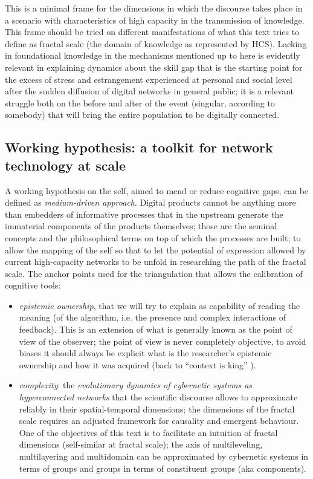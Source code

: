 \documentclass[14pt,a4paper]{extarticle}
\begin{document}
\hspace*{15mm}This is a minimal frame for the dimensions in which the discourse takes place in a scenario with characteristics of high capacity in the transmission of knowledge. This frame should be tried on different manifestations of what this text tries to define as fractal scale (the domain of knowledge as represented by HCS).
\newline
\hspace*{15mm}Lacking in foundational knowledge in the mechanisms mentioned up to here is evidently relevant in explaining dynamics about the skill gap that is the starting point for the excess of stress and estrangement experienced at personal and social level after the sudden diffusion of digital networks in general public; it is a relevant struggle both on the before and after of the event (singular, according to somebody) that will bring the entire population to be digitally connected.

\subsection*{Working hypothesis: a toolkit for network technology at scale}
\label{subsec:toolkit}

\hspace*{15mm}A working hypothesis on the self, aimed to mend or reduce cognitive gaps, can be defined as \textit{medium-driven approach}. Digital products cannot be anything more than embedders of informative processes that in the upstream generate the immaterial components of the products themselves; those are the seminal concepts and the philosophical terms on top of which the processes are built; to allow the mapping of the self so that to let the potential of expression allowed by current high-capacity networks to be unfold in researching the path of the fractal scale. The anchor points used for the triangulation that allows the calibration of cognitive tools:
\begin{itemize}
\item \textit{epistemic ownership}, that we will try to explain as capability of reading the meaning (of the algorithm, i.e. the presence and complex interactions of feedback). This is an extension of what is generally known as the point of view of the observer; the point of view is never completely objective, to avoid biases it should always be explicit what is the researcher's epistemic ownership and how it was acquired (back to “context is king” \cite{doi:10.1057}). 
\item \textit{complexity}: the \textit{evolutionary dynamics of cybernetic systems as hyperconnected networks} that the scientific discourse allows to approximate reliably in their spatial-temporal dimensions; the dimensions of the fractal scale requires an adjusted framework for causality and emergent behaviour.
One of the objectives of this text is to facilitate an intuition of fractal dimensions (self-similar at fractal scale); the axis of multileveling, multilayering and multidomain can be approximated by cybernetic systems in terms of groups and groups in terms of constituent groups (aka components). 
\end{itemize}
\end{document}
